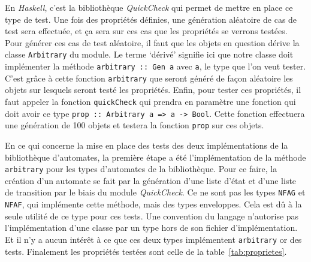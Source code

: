 En \textit{Haskell}, c'est la bibliothèque \textit{QuickCheck} qui permet de
mettre en place ce type de test. Une fois des propriétés définies, une génération
aléatoire de cas de test sera effectuée, et ça sera sur ces cas que les
propriétés se verrons testées. Pour générer ces cas de test aléatoire, il faut
que les objets en question dérive la classe \texttt{Arbitrary} du
module. Le terme `dérivé' signifie ici que notre classe doit implémenter la
méthode \texttt{arbitrary :: Gen a} avec \texttt{a},
le type que l'on veut tester. C'est grâce à cette fonction
\texttt{arbitrary} que seront généré de façon aléatoire les objets
sur lesquels seront testé les propriétés. Enfin, pour tester ces propriétés, il
faut appeler la fonction \texttt{quickCheck} qui prendra en
paramètre une fonction qui doit avoir ce type
\texttt{prop :: Arbitrary a => a -> Bool}. Cette fonction
effectuera une génération de 100 objets et testera la fonction
\texttt{prop} sur ces objets.

\vphantom{}

En ce qui concerne la mise en place des tests des deux implémentations de la
bibliothèque d'automates, la première étape a été l'implémentation de la méthode
\texttt{arbitrary} pour les types d'automates de la bibliothèque.
Pour ce faire, la création d'un automate se fait par la génération d'une liste
d'état et d'une liste de transition par le biais du module \textit{QuickCheck}.
Ce ne sont pas les types \texttt{NFAG} et
\texttt{NFAF}, qui implémente cette méthode, mais des types
enveloppes. Cela est dû à la seule utilité de ce type pour ces tests. Une
convention du langage n'autorise pas l'implémentation d'une classe par un type
hors de son fichier d'implémentation. Et il n'y a aucun intérêt à ce que ces deux
types implémentent \texttt{arbitrary} or des tests. Finalement les
propriétés testées sont celle de la table~\ref{tab:proprietes}.

